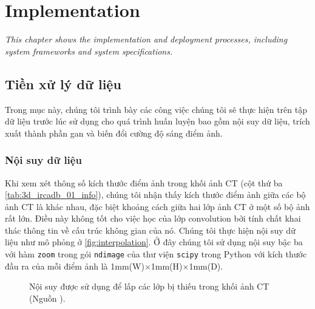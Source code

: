 \chapter{Implementation}
\label{chap:implementation}
	\textit{This chapter shows the implementation and deployment processes, including system frameworks and system specifications.}
\minitoc

\section{Tiền xử lý dữ liệu} 
\label{sec:tien_xu_ly_du_lieu}
	Trong mục này, chúng tôi trình bày các công việc chúng tôi sẽ thực hiện trên tập dữ liệu trước lúc sử dụng cho quá trình huấn luyện bao gồm nội suy dữ liệu, trích xuất thành phần gan và biến đổi cường độ sáng điểm ảnh.

\subsection{Nội suy dữ liệu} 
\label{subsec:noi_suy_du_lieu}
	Khi xem xét thông số kích thước điểm ảnh trong khối ảnh CT (cột thứ ba \autoref{tab:3d_ircadb_01_info}), chúng tôi nhận thấy kích thước điểm ảnh giữa các bộ ảnh CT là khác nhau, đặc biệt khoảng cách giữa hai lớp ảnh CT ở một số bộ ảnh rất lớn. Điều này không tốt cho việc học của lớp convolution bởi tính chất khai thác thông tin về cấu trúc không gian của nó. Chúng tôi thực hiện nội suy dữ liệu như mô phỏng ở \autoref{fig:interpolation}. Ở đây chúng tôi sử dụng nội suy bậc ba với hàm \verb/zoom/ trong gói \verb/ndimage/ của thư viện \verb/scipy/ trong Python với kích thước đầu ra của mỗi điểm ảnh là 1mm(W)$\times$1mm(H)$\times$1mm(D).
	\begin{figure}[h!]
		\centering
		
		\caption[Nội suy được sử dụng để lấp các lớp bị thiếu trong khối ảnh CT.]{Nội suy được sử dụng để lấp các lớp bị thiếu trong khối ảnh CT (Nguồn \cite{sach2017interpolation}).}
		\label{fig:interpolation}
	\end{figure}

